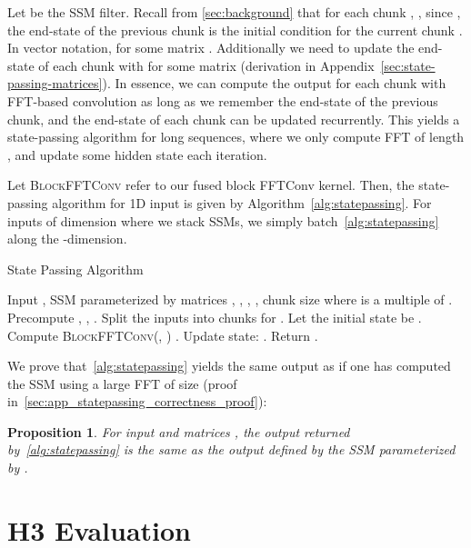 \documentclass{article}
\newtheorem{proposition}{Proposition}
\newcommand{\hthree}{\textsc{H3}\xspace}
\begin{document}
Let  be the SSM filter.
Recall from \cref{sec:background} that for each chunk , , since , the end-state of the previous chunk  is the initial condition for the current chunk .
In vector notation,  for some matrix .
Additionally we need to update the end-state of each chunk with  for some matrix  (derivation in Appendix~\ref{sec:state-passing-matrices}).
In essence, we can compute the output for each chunk with FFT-based convolution as long as we remember the end-state of the previous chunk, and the end-state of each chunk can be updated recurrently.
This yields a state-passing algorithm for long sequences, where we only compute FFT of length , and update some hidden state each iteration.

Let \textsc{BlockFFTConv} refer to our fused block FFTConv kernel.
Then, the state-passing algorithm for 1D input is given by Algorithm~\ref{alg:statepassing}.
For inputs of dimension  where we stack  SSMs, we simply batch~\cref{alg:statepassing} along the -dimension.
\begin{algorithm}[h]
  \caption{\label{alg:statepassing} State Passing Algorithm}
  \small
  \begin{algorithmic}[1]
    \REQUIRE Input , SSM parameterized by matrices , , , , chunk size  where  is a multiple of .
    \STATE Precompute , , .
    \STATE Split the inputs  into  chunks  for .
    \STATE Let the initial state be .
    \FOR{}
      \STATE Compute  \textsc{BlockFFTConv}(, ) .
      \STATE Update state: .
    \ENDFOR
    \STATE Return .
  \end{algorithmic}
\end{algorithm}

We prove that~\cref{alg:statepassing} yields the same output as if one has computed the SSM using a large FFT of size  (proof in~\cref{sec:app_statepassing_correctness_proof}):
\begin{proposition}\label{thm:statepassing_correctness}
  For input  and matrices , the output  returned by~\cref{alg:statepassing} is the same as the output defined by the SSM parameterized by .
\end{proposition}

 \section{\hthree Evaluation}
\label{sec:evaluation}
\end{document}
